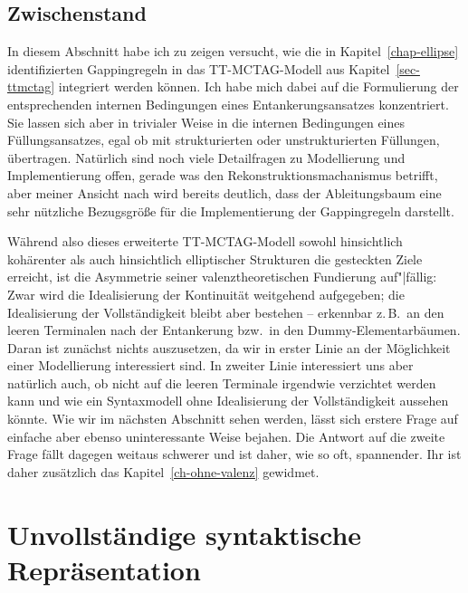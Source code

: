 \subsection{Zwischenstand}

\largerpage %
In diesem Abschnitt habe ich zu zeigen versucht, wie die in Kapitel~\ref{chap-ellipse} identifizierten Gappingregeln in das TT-MCTAG-Modell aus Kapitel~\ref{sec-ttmctag} integriert werden können. Ich habe mich dabei auf die Formulierung der entsprechenden internen Bedingungen eines Entankerungsansatzes konzentriert. Sie lassen sich aber in trivialer Weise in die internen Bedingungen eines Füllungsansatzes, egal ob mit strukturierten oder unstrukturierten Füllungen, übertragen. Natürlich sind noch viele Detailfragen zu Modellierung und Implementierung offen, gerade was den Rekonstruktionsmachanismus betrifft, aber meiner Ansicht nach wird bereits deutlich, dass der Ableitungsbaum eine sehr nützliche Bezugsgrö\ss e für die Implementierung der Gappingregeln darstellt. 

Während also dieses erweiterte TT-MCTAG-Modell sowohl hinsichtlich kohärenter als auch hinsichtlich elliptischer Strukturen die gesteckten Ziele erreicht, ist die Asymmetrie seiner valenztheoretischen Fundierung auf"|fällig: Zwar wird die Idealisierung der Kontinuität weitgehend aufgegeben; die Idealisierung der Vollständigkeit bleibt aber bestehen -- erkennbar z.\,B.\ an den leeren Terminalen nach der Entankerung bzw.\ in den Dummy-Elementarbäumen. Daran ist zunächst nichts auszusetzen, da wir in erster Linie an der Möglichkeit einer Modellierung interessiert sind. In zweiter Linie interessiert uns aber natürlich auch, ob nicht auf die leeren Terminale irgendwie verzichtet werden kann und wie ein Syntaxmodell ohne Idealisierung der Vollständigkeit aussehen könnte. Wie wir im nächsten Abschnitt sehen werden, lässt sich erstere Frage auf einfache aber ebenso uninteressante Weise bejahen. Die Antwort auf die zweite Frage fällt dagegen weitaus schwerer und ist daher, wie so oft, spannender. Ihr ist daher zusätzlich das Kapitel~\ref{ch-ohne-valenz} gewidmet. 


\section{Unvollständige syntaktische Repräsentation}\label{sec-unvollständige-repräsentation}


